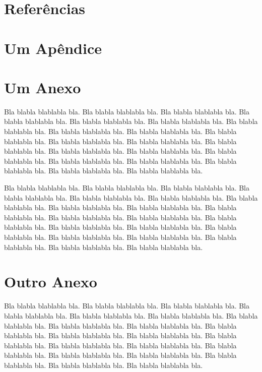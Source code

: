 \documentclass[tcc,capa]{texufpel}
\begin{document}
\chapter{Referências}




 

\apendices
\chapter{Um Apêndice}

\anexos
\chapter{Um Anexo}

Bla blabla blablabla bla.  Bla blabla blablabla bla.  Bla blabla
blablabla bla.  Bla blabla blablabla bla.  Bla blabla blablabla bla.
Bla blabla blablabla bla.  Bla blabla blablabla bla.  Bla blabla
blablabla bla.  Bla blabla blablabla bla.  Bla blabla blablabla bla.
Bla blabla blablabla bla.  Bla blabla blablabla bla.  Bla blabla
blablabla bla.  Bla blabla blablabla bla.  Bla blabla blablabla bla.
Bla blabla blablabla bla.  Bla blabla blablabla bla.  Bla blabla
blablabla bla.  Bla blabla blablabla bla.  Bla blabla blablabla bla.
Bla blabla blablabla bla.

Bla blabla blablabla bla.  Bla blabla blablabla bla.  Bla blabla
blablabla bla.  Bla blabla blablabla bla.  Bla blabla blablabla bla.
Bla blabla blablabla bla.  Bla blabla blablabla bla.  Bla blabla
blablabla bla.  Bla blabla blablabla bla.  Bla blabla blablabla bla.
Bla blabla blablabla bla.  Bla blabla blablabla bla.  Bla blabla
blablabla bla.  Bla blabla blablabla bla.  Bla blabla blablabla bla.
Bla blabla blablabla bla.  Bla blabla blablabla bla.  Bla blabla
blablabla bla.  Bla blabla blablabla bla.  Bla blabla blablabla bla.
Bla blabla blablabla bla.

\chapter{Outro Anexo}

Bla blabla blablabla bla.  Bla blabla blablabla bla.  Bla blabla
blablabla bla.  Bla blabla blablabla bla.  Bla blabla blablabla bla.
Bla blabla blablabla bla.  Bla blabla blablabla bla.  Bla blabla
blablabla bla.  Bla blabla blablabla bla.  Bla blabla blablabla bla.
Bla blabla blablabla bla.  Bla blabla blablabla bla.  Bla blabla
blablabla bla.  Bla blabla blablabla bla.  Bla blabla blablabla bla.
Bla blabla blablabla bla.  Bla blabla blablabla bla.  Bla blabla
blablabla bla.  Bla blabla blablabla bla.  Bla blabla blablabla bla.
Bla blabla blablabla bla.
\end{document}
